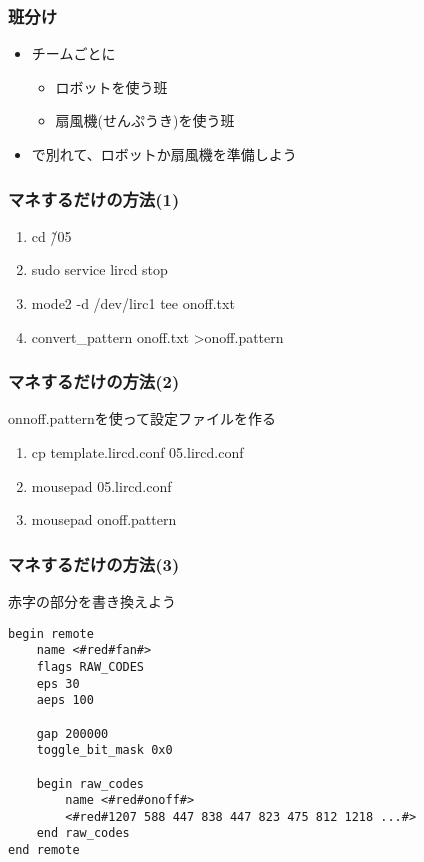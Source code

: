 \begin{frame}
    \frametitle{班分け}
    \begin{itemize}
        \item チームごとに
        \begin{itemize}
            \item ロボットを使う班
            \item 扇風機(せんぷうき)を使う班
        \end{itemize}
        \item で別れて、ロボットか扇風機を準備しよう
    \end{itemize}
\end{frame}

\begin{frame}
    \frametitle{マネするだけの方法(1)} 
    \begin{enumerate}
        \item cd \~/05
        \item sudo service lircd stop
        \item mode2 -d /dev/lirc1 \textbar tee onoff.txt
        \item convert\_pattern onoff.txt \textgreater onoff.pattern
    \end{enumerate}
\end{frame}

\begin{frame}
    \frametitle{マネするだけの方法(2)} 
    onnoff.patternを使って設定ファイルを作る
    \begin{enumerate}
        \item cp template.lircd.conf 05.lircd.conf
        \item mousepad 05.lircd.conf
        \item mousepad onoff.pattern
    \end{enumerate}
\end{frame}

\begin{frame}[fragile]
    \frametitle{マネするだけの方法(3)}
    赤字の部分を書き換えよう
    \begin{lstlisting}
begin remote
    name <#red#fan#>
    flags RAW_CODES
    eps 30
    aeps 100

    gap 200000
    toggle_bit_mask 0x0
    
    begin raw_codes
        name <#red#onoff#>
        <#red#1207 588 447 838 447 823 475 812 1218 ...#>
    end raw_codes
end remote
    \end{lstlisting}
\end{frame}

